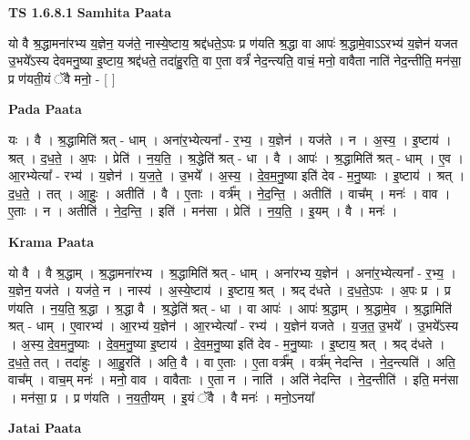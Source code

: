 \documentclass[17pt]{extarticle}
\begin{document}
\textbf{TS 1.6.8.1 } \newline
\textbf{Samhita Paata} \newline

यो वै श्र॒द्धामना॑रभ्य य॒ज्ञेन॒ यज॑ते॒ नास्ये॒ष्टाय॒ श्रद्द॑धते॒ऽपः प्र ण॑यति श्र॒द्धा वा आपः॑ श्र॒द्धामे॒वाऽऽरभ्य॑ य॒ज्ञेन॑ यजत उ॒भये᳚ऽस्य देवमनु॒ष्या इ॒ष्टाय॒ श्रद्द॑धते॒ तदा॑हु॒रति॒ वा ए॒ता वर्त्रं॑ नेद॒न्त्यति॒ वाचं॒ मनो॒ वावैता नाति॑ नेद॒न्तीति॒ मन॑सा॒ प्र ण॑यती॒यं ॅवै मनो॒ - [ ] \newline

\textbf{Pada Paata} \newline

यः । वै । श्र॒द्धामिति॑ श्रत् - धाम् । अना॑र॒भ्येत्यना᳚ - र॒भ्य॒ । य॒ज्ञेन॑ । यज॑ते । न । अ॒स्य॒ । इ॒ष्टाय॑ । श्रत् । द॒ध॒ते॒ । अ॒पः । प्रेति॑ । न॒य॒ति॒ । श्र॒द्धेति॑ श्रत् - धा । वै । आपः॑ । श्र॒द्धामिति॑ श्रत् - धाम् । ए॒व । आ॒रभ्येत्या᳚ - रभ्य॑ । य॒ज्ञेन॑ । य॒ज॒ते॒ । उ॒भये᳚ । अ॒स्य॒ । दे॒व॒म॒नु॒ष्या इति॑ देव - म॒नु॒ष्याः । इ॒ष्टाय॑ । श्रत् । द॒ध॒ते॒ । तत् । आ॒हुः॒ । अतीति॑ । वै । ए॒ताः । वर्त्र᳚म् । ने॒द॒न्ति॒ । अतीति॑ । वाच᳚म् । मनः॑ । वाव । ए॒ताः । न । अतीति॑ । ने॒द॒न्ति॒ । इति॑ । मन॑सा । प्रेति॑ । न॒य॒ति॒ । इ॒यम् । वै । मनः॑ ।  \newline


\textbf{Krama Paata} \newline

यो वै । वै श्र॒द्धाम् । श्र॒द्धामना॑रभ्य । श्र॒द्धामिति॑ श्रत् - धाम् । अना॑रभ्य य॒ज्ञेन॑ । अना॑र॒भ्येत्यना᳚ - र॒भ्य॒ । य॒ज्ञेन॒ यज॑ते । यज॑ते॒ न । नास्य॑ । अ॒स्ये॒ष्टाय॑ । इ॒ष्टाय॒ श्रत् । श्रद् द॑धते । द॒ध॒ते॒ऽपः । अ॒पः प्र । प्र ण॑यति । न॒य॒ति॒ श्र॒द्धा । श्र॒द्धा वै । श्र॒द्धेति॑ श्रत् - धा । वा आपः॑ । आपः॑ श्र॒द्धाम् । श्र॒द्धामे॒व । श्र॒द्धामिति॑ श्रत् - धाम् । ए॒वारभ्य॑ । आ॒रभ्य॑ य॒ज्ञेन॑ । आ॒रभ्येत्या᳚ - रभ्य॑ । य॒ज्ञेन॑ यजते । य॒ज॒त॒ उ॒भये᳚ । उ॒भये᳚ऽस्य । अ॒स्य॒ दे॒व॒म॒नु॒ष्याः । दे॒व॒म॒नु॒ष्या इ॒ष्टाय॑ । दे॒व॒म॒नु॒ष्या इति॑ देव - म॒नु॒ष्याः । इ॒ष्टाय॒ श्रत् । श्रद् द॑धते । द॒ध॒ते॒ तत् । तदा॑हुः । आ॒हु॒रति॑ । अति॒ वै । वा ए॒ताः । ए॒ता वर्त्र᳚म् । वर्त्र॑म् नेदन्ति । ने॒द॒न्त्यति॑ । अति॒ वाच᳚म् । वाच॒म् मनः॑ । मनो॒ वाव । वावैताः । ए॒ता न । नाति॑ । अति॑ नेदन्ति । ने॒द॒न्तीति॑ । इति॒ मन॑सा । मन॑सा॒ प्र । प्र ण॑यति । न॒य॒ती॒यम् । इ॒यं ॅवै । वै मनः॑ । मनो॒ऽनया᳚ \newline

\textbf{Jatai Paata} \newline
\end{document}
